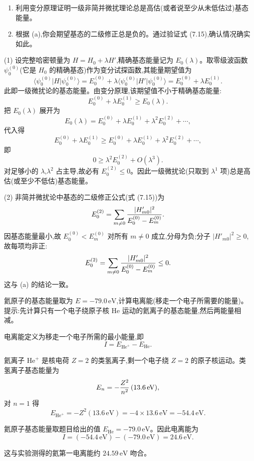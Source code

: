 \begin{question}
\begin{enumerate}
\item 利用变分原理证明一级非简并微扰理论总是高估(或者说至少从未低估过)基态能量。
\item 根据 (a),你会期望基态的二级修正总是负的。通过验证式 (7.15),确认情况确实如此。
\end{enumerate}

\par\smallskip
{}

\end{question}
\begin{solution}
(1) 设完整哈密顿量为 $H=H_0+\lambda H'$,精确基态能量记为 $E_0(\lambda)$。取零级波函数 $\psi_0^{(0)}$(它是 $H_0$ 的精确基态)作为变分试探函数,其能量期望值为
\[
\langle\psi_0^{(0)}|H|\psi_0^{(0)}\rangle
=E_0^{(0)}+\lambda\langle\psi_0^{(0)}|H'|\psi_0^{(0)}\rangle
=E_0^{(0)}+\lambda E_0^{(1)}.
\]
此即一级微扰论的基态能量。由变分原理,该期望值不小于精确基态能量:
\[
E_0^{(0)}+\lambda E_0^{(1)}\ge E_0(\lambda).
\]
把 $E_0(\lambda)$ 展开为
\[
E_0(\lambda)=E_0^{(0)}+\lambda E_0^{(1)}+\lambda^2 E_0^{(2)}+\cdots,
\]
代入得
\[
E_0^{(0)}+\lambda E_0^{(1)}\ge E_0^{(0)}+\lambda E_0^{(1)}+\lambda^2 E_0^{(2)}+\cdots,
\]
即
\[
0\ge\lambda^2 E_0^{(2)}+O(\lambda^3).
\]
对足够小的 $\lambda$,$\lambda^2$ 占主导,故必有 $E_0^{(2)}\le0$。因此一级微扰论(只取到 $\lambda^1$ 项)总是高估(或至少不低估)基态能量。

(2) 非简并微扰论中基态的二级修正公式(式 (7.15))为
\[
E_0^{(2)}=\sum_{m\neq0}{|H'_{m0}|^2\over E_0^{(0)}-E_m^{(0)}}.
\]
因基态能量最小,故 $E_0^{(0)}<E_m^{(0)}$ 对所有 $m\ne0$ 成立,分母为负;分子 $|H'_{m0}|^2\ge0$,故每项均非正:
\[
E_0^{(2)}=\sum_{m\neq0}{|H'_{m0}|^2\over E_0^{(0)}-E_m^{(0)}}\le0.
\]
这与 (a) 的结论一致。
\end{solution}

\begin{question}
氦原子的基态能量取为 $E=-79.0\,\mathrm{eV}$,计算电离能(移走一个电子所需要的能量)。提示:先计算只有一个电子绕原子核 He 运动的氦离子的基态能量,然后两能量相减。
\end{question}
\begin{solution}
电离能定义为移走一个电子所需的最小能量,即
\[
I=E_{\mathrm{He}^+}-E_{\mathrm{He}}.
\]

氦离子 $\mathrm{He}^+$ 是核电荷 $Z=2$ 的类氢离子,剩一个电子绕 $Z=2$ 的原子核运动。类氢离子基态能量为
\[
E_n=-{Z^2\over n^2}\,(13.6\,\mathrm{eV}),
\]
对 $n=1$ 得
\[
E_{\mathrm{He}^+}=-Z^2(13.6\,\mathrm{eV})=-4\times13.6\,\mathrm{eV}=-54.4\,\mathrm{eV}.
\]

氦原子基态能量取题目给出的值 $E_{\mathrm{He}}=-79.0\,\mathrm{eV}$。因此电离能为
\[
I=(-54.4\,\mathrm{eV})-(-79.0\,\mathrm{eV})
=\boxed{24.6\,\mathrm{eV}}.
\]

这与实验测得的氦第一电离能约 $24.59\,\mathrm{eV}$ 吻合。
\end{solution}

